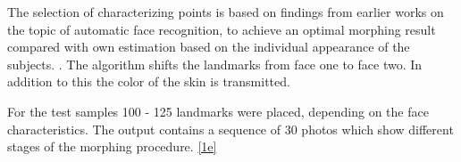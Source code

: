 The selection of characterizing points  is based on findings  from earlier works on the topic of automatic face recognition, to achieve an optimal morphing result compared with own estimation based on the individual appearance of the subjects. \cite[60ff]{jain2008handbook} \cite{amos2016openface}  .
The algorithm shifts the landmarks from face one to face two. In addition to this the color of the skin is transmitted. 

For the test samples 100 - 125 landmarks were placed, depending on the face characteristics. The output contains a sequence of 30 photos which show different stages of the morphing procedure. \ref{1e}


